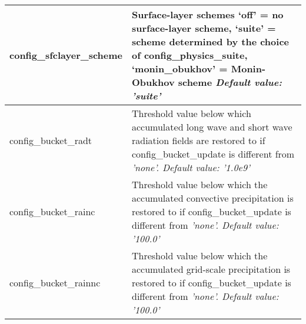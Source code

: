 {\begin{longtable}{|p{2.0in} |p{4.25in}|}
  config\_sfclayer\_scheme &  Surface-layer schemes \newline
                                             `off' = no surface-layer scheme, \newline
                                             `suite'  = scheme determined by the choice of config\_physics\_suite, \newline
                                             `monin\_obukhov' = Monin-Obukhov scheme \newline                                              
  {\em Default value: 'suite'} \\ \hline
 
  config\_bucket\_radt &  Threshold value below which accumulated long wave and short wave radiation fields are restored to if config\_bucket\_update is different from \em 'none'. \newline
  {\em Default value: '1.0e9'} \\ \hline
  
  config\_bucket\_rainc &  Threshold value below which the accumulated convective precipitation is restored to if config\_bucket\_update is different from \em 'none'.\newline
  {\em Default value: '100.0'} \\ \hline
  
  config\_bucket\_rainnc &  Threshold value below which the accumulated grid-scale precipitation is restored to if config\_bucket\_update is different from \em 'none'. \newline
  {\em Default value: '100.0'} \\ \hline
  
\end{longtable}
}


